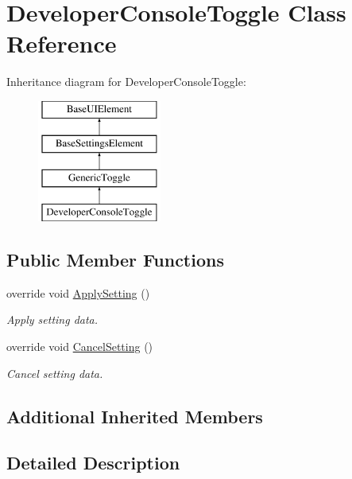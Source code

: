 \hypertarget{class_developer_console_toggle}{}\section{Developer\+Console\+Toggle Class Reference}
\label{class_developer_console_toggle}
Inheritance diagram for Developer\+Console\+Toggle\+:\begin{figure}[H]
\begin{center}
\leavevmode
\includegraphics[height=4.000000cm]{class_developer_console_toggle}
\end{center}
\end{figure}
\subsection*{Public Member Functions}
\begin{DoxyCompactItemize}
\item 
override void \hyperlink{class_developer_console_toggle_a5b3b9f9e622a31e8a1ad4675d920b454}{Apply\+Setting} ()
\begin{DoxyCompactList}\small\item\em Apply setting data. \end{DoxyCompactList}\item 
override void \hyperlink{class_developer_console_toggle_a7621c9152f401719538ba3008f3dcfd2}{Cancel\+Setting} ()
\begin{DoxyCompactList}\small\item\em Cancel setting data. \end{DoxyCompactList}\end{DoxyCompactItemize}
\subsection*{Additional Inherited Members}


\subsection{Detailed Description}


